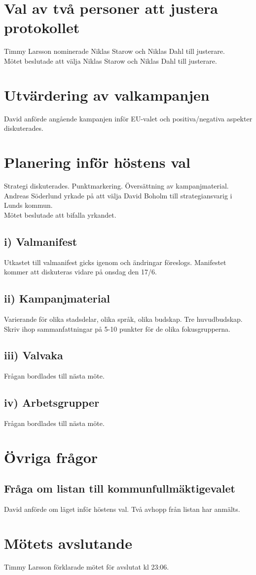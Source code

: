 \documentclass[a4paper,10pt]{article}
\begin{document}
\section{Val av två personer att justera protokollet}
Timmy Larsson nominerade Niklas Starow och Niklas Dahl till justerare.\\
Mötet beslutade att välja Niklas Starow och Niklas Dahl till justerare.

\section{Utvärdering av valkampanjen}
David anförde angående kampanjen inför EU-valet och positiva/negativa aspekter diskuterades.

\section{Planering inför höstens val}
Strategi diskuterades. Punktmarkering. Översättning av kampanjmaterial. \\
Andreas Söderlund yrkade på att välja David Boholm till strategiansvarig i Lunds kommun. \\
Mötet beslutade att bifalla yrkandet.

\subsection*{i) Valmanifest}
Utkastet till valmanifest gicks igenom och ändringar föreslogs. Manifestet kommer att diskuteras vidare på onsdag den 17/6. \\

\subsection*{ii) Kampanjmaterial}
Varierande för olika stadsdelar, olika språk, olika budskap. Tre huvudbudskap. Skriv ihop sammanfattningar på 5-10 punkter för de olika fokusgrupperna.

\subsection*{iii) Valvaka}
Frågan bordlades till nästa möte.

\subsection{iv) Arbetsgrupper}
Frågan bordlades till nästa möte.

\section{Övriga frågor}
\subsection*{Fråga om listan till kommunfullmäktigevalet}
David anförde om läget inför höstens val. Två avhopp från listan har anmälts.


\section{Mötets avslutande}
Timmy Larsson förklarade mötet för avslutat kl 23:06.
\end{document}
